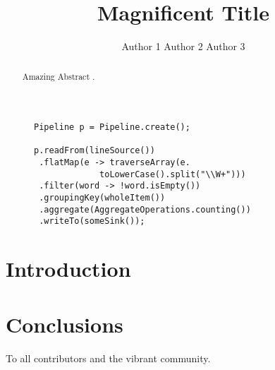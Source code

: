 \documentclass[sigconf, nonacm]{acmart}
\begin{document}
\title{Magnificent Title}

\author{Author 1 \hfill Author 2 \hfill Author 3}




\renewcommand{\shortauthors}{Author et al.}


\begin{abstract}
Amazing Abstract \cite{delite}.
\end{abstract}


\maketitle





\begin{figure}[t]
\begin{lstlisting}[style=javalang, numbers=none, xleftmargin=0in, label={lst:wordcount}, caption={Code example: Word count.}]
Pipeline p = Pipeline.create();

p.readFrom(lineSource())
 .flatMap(e -> traverseArray(e.
             toLowerCase().split("\\W+")))
 .filter(word -> !word.isEmpty())
 .groupingKey(wholeItem())
 .aggregate(AggregateOperations.counting())
 .writeTo(someSink());
\end{lstlisting}
\vspace{-2mm}
\end{figure}


\section{Introduction}

\section{Conclusions}

\begin{acks}
To all contributors and the vibrant community.
\end{acks}

\balance
  


  
\end{document}
